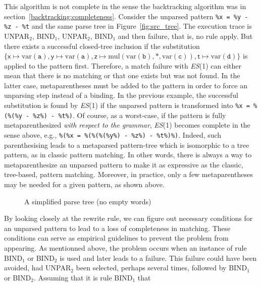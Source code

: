 This algorithm is not complete in the sense the backtracking algorithm
was in section~\ref{backtracking:completeness}. Consider the unparsed
pattern \texttt{\%x = \%y - \%z - \%t} and the same parse tree in
Figure~\ref{fig:src_tree}. The execution trace is
\textsf{UNPAR}\(_2\), \textsf{BIND}\(_1\), \textsf{UNPAR}\(_2\),
\textsf{BIND}\(_1\) and then failure, that is, no rule apply. But
there exists a successful closed\hyp{}tree inclusion if the
substitution \(\{\textsf{x} \mapsto \text{var}(\texttt{a}), \textsf{y}
\mapsto \text{var}(\texttt{a}), \textsf{z} \mapsto
\text{mul}(\text{var}(\texttt{b}), \texttt{*},
\text{var}(\texttt{c})), \textsf{t} \mapsto \text{var}(\texttt{d})\}\)
is applied to the pattern first. Therefore, a match failure with
\textit{ES}(1) can either mean that there is no matching or that one
exists but was not found. In the latter case, meta\-parentheses must
be added to the pattern in order to force an unparsing step instead of
a binding. In the previous example, the successful substitution is
found by \textit{ES}(1) if the unparsed pattern is transformed into
\texttt{\%x = \%(\%(\%y - \%z\%) - \%t\%)}. Of course, as a
worst\hyp{}case, if the pattern is fully meta\-parenthesized
\emph{with respect to the grammar}, \textit{ES}(1) becomes complete in
the sense above, e.g., \texttt{\%(\%x = \%(\%(\%(\%y\%) - \%z\%) -
  \%t\%)\%)}. Indeed, such parenthesising leads to a meta\-parsed
pattern\hyp{}tree which is isomorphic to a tree pattern, as in classic
pattern matching. In other words, there is always a way to
meta\-parenthesize an unparsed pattern to make it as expressive as the
classic, tree\hyp{}based, pattern matching. Moreover, in practice,
only a few meta\-parentheses may be needed for a given pattern, as
shown above.
\begin{figure}[t]
%
\caption{A simplified parse tree (no empty words)\label{fig:const_static}}
\end{figure}
By looking closely at the rewrite rule, we can figure out necessary
conditions for an unparsed pattern to lead to a loss of completeness
in matching. These conditions can serve as empirical guidelines to
prevent the problem from appearing. As mentionned above, the problem
occurs when an instance of rule \textsf{BIND}\(_1\) or
\textsf{BIND}\(_2\) is used and later leads to a failure. This failure
could have been avoided, had \textsf{UNPAR}\(_2\) been selected,
perhaps several times, followed by \textsf{BIND}\(_1\) or
\textsf{BIND}\(_2\). Assuming that it is rule \textsf{BIND}\(_1\) that
